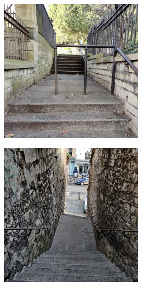 \begin{figure}[!hbtp]
      \begin{subfigure}[b]{\textwidth}
         \centering
         \begin{subfigure}[b]{0.32\textwidth}
             \centering
             \includegraphics[width=\textwidth]{content/3-Methods/enviroments/stair_1_modified.jpg}
        \end{subfigure}
        \hfill
         \begin{subfigure}[b]{0.32\textwidth}
             \centering
             \includegraphics[width=\textwidth]{content/3-Methods/enviroments/stair_2_modified.jpg}

\end{subfigure}
\end{subfigure}
\end{figure}
